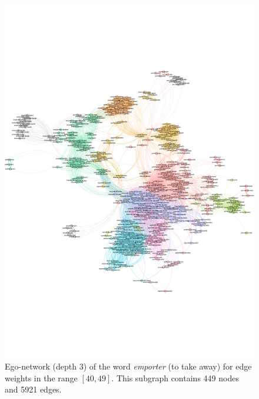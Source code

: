 \begin{figure}[t]
    \centering
    \includegraphics[width=\textwidth, trim=0cm 5.5cm 0cm 5.5cm, clip]{assets/emporter-ego.pdf}
    \caption{Ego-network (depth 3) of the word \textit{emporter} (to take away) for edge weights in the range $[40,49]$. This subgraph contains 449 nodes and 5921 edges.}
    \label{fig:emporter-ego}
\end{figure}

